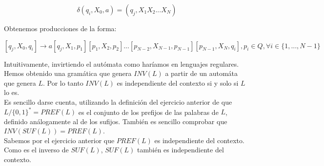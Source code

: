 \documentclass[11pt,a4paper]{article}
\begin{document}
$$ \delta(q_i, X_0, a) = (q_j, X_1X_2...X_N) $$

Obtenemos producciones de la forma:

$$[q_j, X_0, q_i] \rightarrow a[q_j, X_1, p_1][p_1, X_2, p_2]...[p_{N-2}, X_{N-1},p_{N-1}][p_{N-1},X_N,q_i], p_i \in Q, \forall i \in \{1,...,N-1\}$$

Intuitivamente, invirtiendo el autómata como haríamos en lenguajes regulares. Hemos obtenido una gramática que genera $INV(L)$ a partir de un automáta que genera $L$. Por lo tanto $INV(L)$ es independiente del contexto si y solo si $L$ lo es. \\

Es sencillo darse cuenta, utilizando la definición del ejercicio anterior de que $L/\{0,1\}^* = PREF(L)$ es el conjunto de los prefijos de las palabras de $L$, definido análogamente al de los sufijos. También es sencillo comprobar que $INV ( SUF (L) ) = PREF (L)$. \\

Sabemos por el ejercicio anterior que $PREF(L)$ es independiente del contexto. Como es el inverso de $SUF(L)$, $SUF(L)$ también es independiente del contexto.
\end{document}
